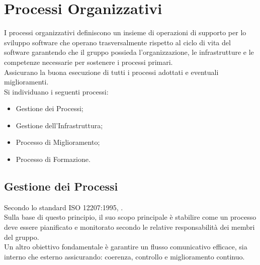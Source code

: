 \section{Processi Organizzativi}
I processi organizzativi definiscono un insieme di operazioni di supporto per lo sviluppo software che operano trasversalmente rispetto al ciclo di vita del software garantendo che il gruppo possieda l’organizzazione, le infrastrutture e le competenze necessarie per sostenere i processi primari.\\
Assicurano la buona esecuzione di tutti i processi adottati e eventuali miglioramenti.\\
Si individuano i seguenti processi:
\begin{itemize}[itemsep=3pt, parsep=1pt, label=$\scriptstyle\bullet$]
    \item Gestione dei Processi;
    \item Gestione dell'Infrastruttura;
    \item Processo di Miglioramento;
    \item Processo di Formazione.
\end{itemize}

\subsection{Gestione dei Processi}
Secondo lo standard ISO 12207:1995, .\\
Sulla base di questo principio, il suo scopo principale è stabilire come un processo deve essere pianificato e monitorato secondo le relative responsabilità dei membri del gruppo.\\
Un altro obiettivo fondamentale è garantire un flusso comunicativo efficace, sia interno che esterno assicurando: coerenza, controllo e miglioramento continuo.
